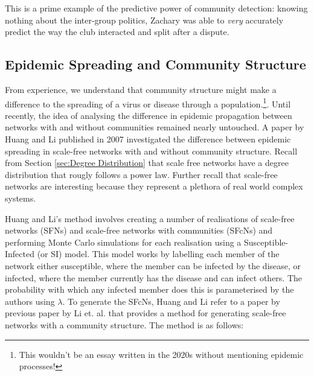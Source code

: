 This is a prime example of the predictive power of community detection: knowing nothing about the inter-group politics, Zachary was able to \emph{very} accurately predict the way the club interacted and split after a dispute.

\subsection{Epidemic Spreading and Community Structure}\label{sec:epidemics}
From experience, we understand that community structure might make a difference to the spreading of a virus or disease through a population.\footnote{This wouldn't be an essay written in the 2020s without mentioning epidemic processes!}. Until recently, the idea of analysing the difference in epidemic propagation between networks with and without communities remained nearly untouched. A paper by Huang and Li published in 2007 \cite{Huang_2007} investigated the difference between epidemic spreading in scale-free networks with and without community structure. Recall from Section \ref{sec:Degree Distribution} that scale free networks have a degree distribution that rougly follows a power law. Further recall that scale-free networks are interesting because they represent a plethora of real world complex systems.

Huang and Li's method involves creating a number of realisations of scale-free networks (SFNs) and scale-free networks with communities (SFcNs) and performing Monte Carlo simulations for each realisation using a Susceptible-Infected (or SI) model. This model works by labelling each member of the network either susceptible, where the member can be infected by the disease, or infected, where the member currently has the disease and can infect others. The probability with which any infected member does this is parameterised by the authors using $\lambda$. To generate the SFcNs, Huang and Li refer to a paper by previous paper by Li et. al. \cite{Li_2005} that provides a method for generating scale-free networks with a community structure. The method is as follows:

